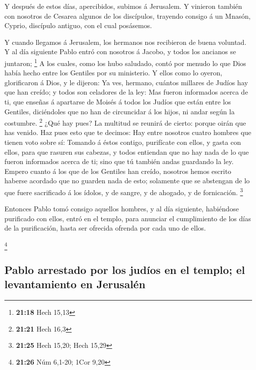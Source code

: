  Y después de estos días, apercibidos, subimos á
Jerusalem.  Y vinieron también con nosotros de Cesarea
algunos de los discípulos, trayendo consigo á un Mnasón, Cyprio,
discípulo antiguo, con el cual posásemos.

 Y cuando llegamos á Jerusalem, los hermanos nos
recibieron de buena voluntad.  Y al día siguiente Pablo
entró con nosotros á Jacobo, y todos los ancianos se juntaron;
\footnote{\textbf{21:18} Hech 15,13}  A los cuales, como
los hubo saludado, contó por menudo lo que Dios había hecho entre los
Gentiles por su ministerio.  Y ellos como lo oyeron,
glorificaron á Dios, y le dijeron: Ya ves, hermano, cuántos millares de
Judíos hay que han creído; y todos son celadores de la ley:
 Mas fueron informados acerca de ti, que enseñas á
apartarse de Moisés á todos los Judíos que están entre los Gentiles,
diciéndoles que no han de circuncidar á los hijos, ni andar según la
costumbre. \footnote{\textbf{21:21} Hech 16,3}  ¿Qué hay
pues? La multitud se reunirá de cierto: porque oirán que has venido.
 Haz pues esto que te decimos: Hay entre nosotros cuatro
hombres que tienen voto sobre sí:  Tomando á éstos
contigo, purifícate con ellos, y gasta con ellos, para que rasuren sus
cabezas, y todos entiendan que no hay nada de lo que fueron informados
acerca de ti; sino que tú también andas guardando la ley.
 Empero cuanto á los que de los Gentiles han creído,
nosotros hemos escrito haberse acordado que no guarden nada de esto;
solamente que se abstengan de lo que fuere sacrificado á los ídolos, y
de sangre, y de ahogado, y de fornicación. \footnote{\textbf{21:25} Hech
  15,20; Hech 15,29}

 Entonces Pablo tomó consigo aquellos hombres, y al día
siguiente, habiéndose purificado con ellos, entró en el templo, para
anunciar el cumplimiento de los días de la purificación, hasta ser
ofrecida ofrenda por cada uno de ellos.

\footnote{\textbf{21:26} Núm 6,1-20; 1Cor 9,20}

\hypertarget{pablo-arrestado-por-los-juduxedos-en-el-templo-el-levantamiento-en-jerusaluxe9n}{%
\subsection{Pablo arrestado por los judíos en el templo; el
levantamiento en
Jerusalén}\label{pablo-arrestado-por-los-juduxedos-en-el-templo-el-levantamiento-en-jerusaluxe9n}}

